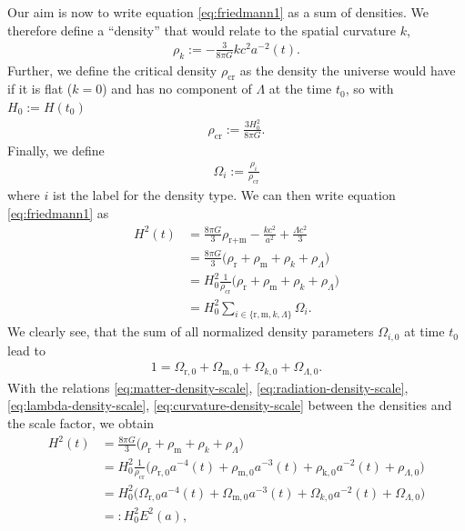 \noindent Our aim is now to write equation \eqref{eq:friedmann1} as a sum of densities. We therefore define a ``density'' that would relate to the spatial curvature $k$,
\begin{align}
    \rho_{k} := -\frac{3}{8 \pi G} kc^2 a^{-2}(t). \label{eq:curvature-density-scale}
\end{align}
Further, we define the critical density $\rho_{\text{cr}}$ as the density the universe would have if it is flat ($k=0$) and has no component of $\Lambda$ at the time $t_{0}$, so with $H_{0} := H(t_{0})$
\begin{align}
    \rho_{\text{cr}} := \frac{3 H_{0}^2}{8\pi G}. \label{eq:critical-density} 
\end{align}
Finally, we define 
\begin{align}
    \Omega_{i} := \frac{\rho_{i}}{\rho_{\text{cr}}} \label{eq:normalized-density}
\end{align}
where $i$ ist the label for the density type. We can then write equation \eqref{eq:friedmann1} as 
\begin{align}
    H^{2}(t) &= \frac{8\pi G}{3} \rho_{\text{r+m}} - \frac{kc^2}{a^2} + \frac{\Lambda c^2}{3} \nonumber \\
             &= \frac{8 \pi G}{3} \bigl( \rho_{\text{r}} + \rho_{\text{m}} + \rho_{k} + \rho_{\Lambda} \bigr) \nonumber \\     
             &= H_{0}^{2} \frac{1}{\rho_{\text{cr}}} \bigl( \rho_{\text{r}} + \rho_{\text{m}} + \rho_{k} + \rho_{\Lambda} \bigr) \nonumber \\
             &= H_{0}^{2} \sum_{i \in \{\text{r}, \text{m}, k, \Lambda \}} \Omega_{i}. \label{eq:hubble-square}
\end{align}
We clearly see, that the sum of all normalized density parameters $\Omega_{i,0}$ at time $t_{0}$ lead to
\begin{align}
    1 = \Omega_{\text{r},0} + \Omega_{\text{m},0} + \Omega_{k,0} + \Omega_{\Lambda, 0}. \label{eq:density-parameters-sum} 
\end{align}
With the relations \eqref{eq:matter-density-scale}, \eqref{eq:radiation-density-scale}, \eqref{eq:lambda-density-scale}, \eqref{eq:curvature-density-scale} between the densities and the scale factor, we obtain
\begin{align*}
    H^{2}(t) &= \frac{8 \pi G}{3} \bigl(\rho_{\text{r}} + \rho_{\text{m}} + \rho_{k} + \rho_{\Lambda} \bigr) \\
             &= H_{0}^{2} \frac{1}{\rho_{\text{cr}}} \bigl(\rho_{\text{r},0} a^{-4}(t) + \rho_{\text{m},0} a^{-3}(t) + \rho_{\text{k},0} a^{-2}(t) + \rho_{\Lambda,0} \bigr) \\
             &= H_{0}^{2} \bigl(\Omega_{\text{r},0} a^{-4}(t) + \Omega_{\text{m},0} a^{-3}(t) + \Omega_{k,0} a^{-2}(t) + \Omega_{\Lambda,0} \bigr) \\
             &=: H_{0}^{2} E^{2}(a),
\end{align*}
